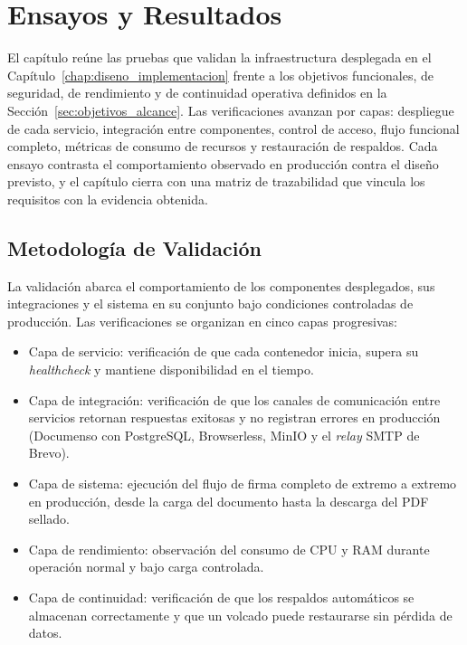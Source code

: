 \chapter{Ensayos y Resultados}
\label{chap:ensayos_resultados}

El capítulo reúne las pruebas que validan la infraestructura desplegada en el Capítulo~\ref{chap:diseno_implementacion} frente a los objetivos funcionales, de seguridad, de rendimiento y de continuidad operativa definidos en la Sección~\ref{sec:objetivos_alcance}. Las verificaciones avanzan por capas: despliegue de cada servicio, integración entre componentes, control de acceso, flujo funcional completo, métricas de consumo de recursos y restauración de respaldos. Cada ensayo contrasta el comportamiento observado en producción contra el diseño previsto, y el capítulo cierra con una matriz de trazabilidad que vincula los requisitos con la evidencia obtenida.

\section{Metodología de Validación}
\label{sec:metodologia_validacion}

La validación abarca el comportamiento de los componentes desplegados, sus integraciones y el sistema en su conjunto bajo condiciones controladas de producción. Las verificaciones se organizan en cinco capas progresivas:

\begin{itemize}
    \item Capa de servicio: verificación de que cada contenedor inicia, supera su \textit{healthcheck} y mantiene disponibilidad en el tiempo.
    \item Capa de integración: verificación de que los canales de comunicación entre servicios retornan respuestas exitosas y no registran errores en producción (Documenso con PostgreSQL, Browserless, MinIO y el \textit{relay} SMTP de Brevo).
    \item Capa de sistema: ejecución del flujo de firma completo de extremo a extremo en producción, desde la carga del documento hasta la descarga del PDF sellado.
    \item Capa de rendimiento: observación del consumo de CPU y RAM durante operación normal y bajo carga controlada.
    \item Capa de continuidad: verificación de que los respaldos automáticos se almacenan correctamente y que un volcado puede restaurarse sin pérdida de datos.
\end{itemize}

